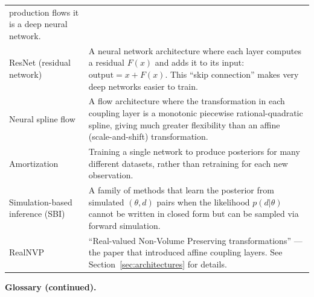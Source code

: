 \documentclass[11pt,letterpaper]{article}
\begin{document}
\begin{table}[H]
\begin{tabular}{@{}p{}p{}@{}}
  production flows it is a deep neural network. \\[4pt]
ResNet (residual network) &
  A neural network architecture where each layer computes a residual
  $F(x)$ and adds it to its input: $\mathrm{output} = x + F(x)$.
  This ``skip connection'' makes very deep networks easier to train. \\[4pt]
Neural spline flow &
  A flow architecture where the transformation in each coupling layer
  is a monotonic piecewise rational-quadratic spline, giving much
  greater flexibility than an affine (scale-and-shift)
  transformation. \\[4pt]
Amortization &
  Training a single network to produce posteriors for many different
  datasets, rather than retraining for each new observation. \\[4pt]
Simulation-based inference (SBI) &
  A family of methods that learn the posterior from simulated
  $(\theta, d)$ pairs when the likelihood $p(d|\theta)$ cannot be
  written in closed form but can be sampled via forward simulation. \\[4pt]
RealNVP &
  ``Real-valued Non-Volume Preserving transformations''
  \cite{dinh2017}---the paper that introduced affine coupling layers.
  See Section~\ref{sec:architectures} for details. \\
\bottomrule
\end{tabular}
\end{table}

\newpage

\noindent\textbf{Glossary (continued).}
\end{document}
